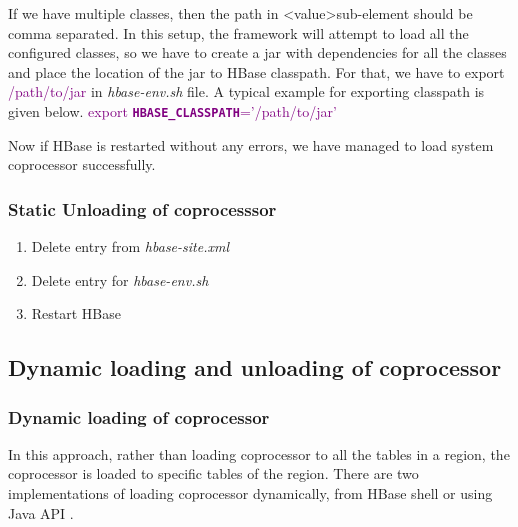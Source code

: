 \documentclass[11pt,a4paper,bibtotoc,idxtotoc,headsepline,footsepline,footexclude,BCOR12mm,DIV13]{scrbook}
\begin{document}
 If we have multiple classes, then the path in \textless value\textgreater \space sub-element should be comma separated. In this setup, the framework will attempt to load all the configured classes, so we have to create a jar with dependencies for all the classes and place the location of the jar to HBase classpath. For that, we have to export \textcolor{purple}{/path/to/jar} in \emph{hbase-env.sh} file. A typical example for exporting classpath is given below. \newline \newline
 \textcolor{purple}{export \textbf{\texttt{HBASE\_CLASSPATH}}='/path/to/jar'} \newline
 
Now if HBase is restarted without any errors, we have managed to load system coprocessor successfully. 

\subsubsection{Static Unloading of coprocesssor}
\begin{enumerate}
    \item Delete entry from \emph{hbase-site.xml}
    \item Delete entry for \emph{hbase-env.sh}
    \item Restart HBase
\end{enumerate}

\subsection{Dynamic loading and unloading of coprocessor}

\subsubsection{Dynamic loading of coprocessor}
In this approach, rather than loading coprocessor to all the tables in a region, the coprocessor is loaded to specific tables of the region. There are two implementations of loading coprocessor dynamically, from HBase shell or using Java API \cite{hbase:site}.
\end{document}

